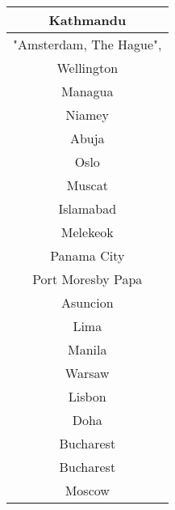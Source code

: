 \documentclass{article}
\begin{document}
\begin{center}
\begin{tabular} {|| c ||}
   Kathmandu\\ \hline 
   "Amsterdam, The Hague",\\ \hline 
   Wellington\\ \hline 
   Managua\\ \hline 
   Niamey\\ \hline 
   Abuja\\ \hline 
   Oslo\\ \hline 
   Muscat\\ \hline 
   Islamabad\\ \hline 
   Melekeok\\ \hline 
   Panama City\\ \hline 
   Port Moresby Papa\\ \hline 
   Asuncion\\ \hline 
   Lima\\ \hline 
   Manila\\ \hline 
   Warsaw\\ \hline 
   Lisbon\\ \hline 
   Doha\\ \hline 
   Bucharest\\ \hline 
   Bucharest\\ \hline 
   Moscow\\ \hline 
\end{tabular}
\end{center}
\end{document}

